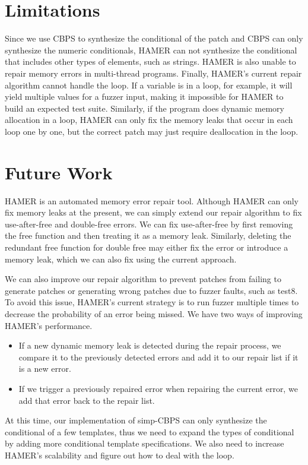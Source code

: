 \documentclass[a4paper,11pt,oneside,openany]{book}
\begin{document}
\section{Limitations}
Since we use CBPS to synthesize the conditional of the patch and CBPS can only synthesize the numeric conditionals, HAMER can not synthesize the conditional that includes other types of elements, such as strings. HAMER is also unable to repair memory errors in multi-thread programs. Finally, HAMER's current repair algorithm cannot handle the loop. If a variable is in a loop, for example, it will yield multiple values for a fuzzer input, making it impossible for HAMER to build an expected test suite. Similarly, if the program does dynamic memory allocation in a loop, HAMER can only fix the memory leaks that occur in each loop one by one, but the correct patch may just require deallocation in the loop.
\section{Future Work}
HAMER is an automated memory error repair tool. Although HAMER can only fix memory leaks at the present, we can simply extend our repair algorithm to fix use-after-free and double-free errors. We can fix use-after-free by first removing the free function and then treating it as a memory leak. Similarly, deleting the redundant free function for double free may either fix the error or introduce a memory leak, which we can also fix using the current approach.

We can also improve our repair algorithm to prevent patches from failing to generate patches or generating wrong patches due to fuzzer faults, such as test8. To avoid this issue, HAMER's current strategy is to run fuzzer multiple times to decrease the probability of an error being missed. We have two ways of improving HAMER's performance.
\begin{itemize}
\item If a new dynamic memory leak is detected during the repair process, we compare it to the previously detected errors and add it to our repair list if it is a new error.
\item If we trigger a previously repaired error when repairing the current error, we add that error back to the repair list.
\end{itemize}

At this time, our implementation of simp-CBPS can only synthesize the conditional of a few templates, thus we need to expand the types of conditional by adding more conditional template specifications. We also need to increase HAMER's scalability and figure out how to deal with the loop.
\end{document}
